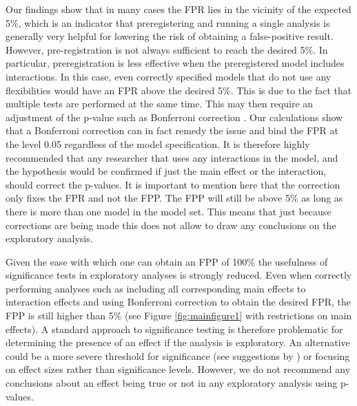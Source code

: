 Our findings show that in many cases the FPR lies in the vicinity of the expected 5\%, which is an indicator that preregistering and running a single analysis is generally very helpful for lowering the risk of obtaining a false-positive result. However, pre-registration is not always sufficient to reach the desired 5\%. In particular, preregistration is less effective when the preregistered model includes interactions. In this case, even correctly specified models that do not use any flexibilities would have an FPR above the desired 5\%. This is due to the fact that multiple tests are performed at the same time. This may then require an adjustment of the p-value such as Bonferroni correction \citep{dunn1961multiple}. Our calculations show that a Bonferroni correction can in fact remedy the issue and bind the FPR at the level 0.05 regardless of the model specification. It is therefore highly recommended that any researcher that uses any interactions in the model, and the hypothesis would be confirmed if just the main effect or the interaction, should correct the p-values. It is important to mention here that the correction only fixes the FPR and not the FPP. The FPP will still be above 5\% as long as there is more than one model in the model set. This means that just because corrections are being made this does not allow to draw any conclusions on the exploratory analysis. 


Given the ease with which one can obtain an FPP of 100\% the usefulness of significance tests in exploratory analyses is strongly reduced. Even when correctly performing analyses such as including all corresponding main effects to interaction effects and using Bonferroni correction to obtain the desired FPR, the FPP is still higher than 5\% (see Figure \ref{fig:mainfigure1} with restrictions on main effects). A standard approach to significance testing is therefore problematic for determining the presence of an effect if the analysis is exploratory. An alternative could be a more severe threshold for significance (see suggestions by \cite{benjamin2018}) or focusing on effect sizes rather than significance levels. However, we do not recommend any conclusions about an effect being true or not in any exploratory analysis using p-values.  
    
